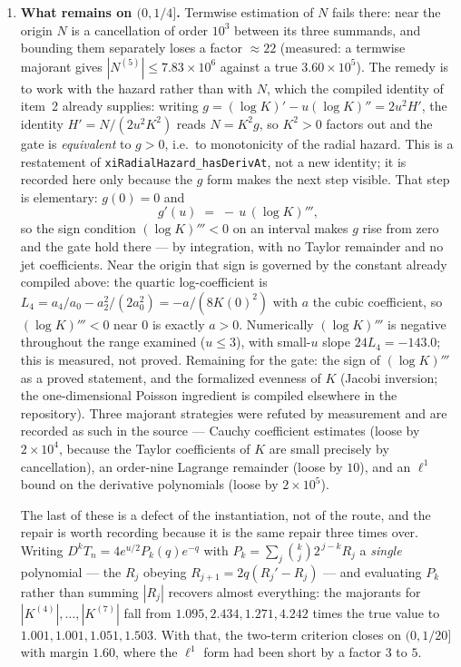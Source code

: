 \documentclass[11pt]{article}
\theoremstyle{plain}
\theoremstyle{definition}
\theoremstyle{remark}
\begin{document}
\begin{enumerate}
\item \textbf{What remains on $(0,1/4]$.}  Termwise estimation of $N$ fails
there: near the origin $N$ is a cancellation of order $10^{3}$ between its
three summands, and bounding them separately loses a factor $\approx22$
(measured: a termwise majorant gives $|N^{(5)}|\le7.83\times10^{6}$ against a
true $3.60\times10^{5}$).  The remedy is to work with the hazard rather than
with $N$, which the compiled identity of item~2 already supplies: writing
$g=(\log K)'-u(\log K)''=2u^{2}H'$, the identity
$H'=N/(2u^{2}K^{2})$ reads $N=K^{2}g$, so $K^{2}>0$ factors out and the gate
is \emph{equivalent} to $g>0$, i.e.\ to monotonicity of the radial hazard.
This is a restatement of \texttt{xiRadialHazard\_hasDerivAt}, not a new
identity; it is recorded here only because the $g$ form makes the next step
visible.  That step is elementary: $g(0)=0$ and
\[
  g'(u) \;=\; -\,u\,(\log K)''' ,
\]
so the sign condition $(\log K)'''<0$ on an interval makes $g$ rise from zero
and the gate hold there --- by integration, with no Taylor remainder and no
jet coefficients.  Near the origin that sign is governed by the constant
already compiled above: the quartic log-coefficient is
$L_4=a_4/a_0-a_2^{2}/(2a_0^{2})=-a/(8K(0)^{2})$ with $a$ the cubic
coefficient, so $(\log K)'''<0$ near $0$ is exactly $a>0$.  Numerically
$(\log K)'''$ is negative throughout the range examined ($u\le3$), with
small-$u$ slope $24L_4=-143.0$; this is measured, not proved.  Remaining for
the gate: the sign of $(\log K)'''$ as a proved statement, and the formalized
evenness of $K$ (Jacobi inversion; the one-dimensional Poisson ingredient is
compiled elsewhere in the repository).  Three majorant strategies were refuted
by measurement and are recorded as such in the source --- Cauchy coefficient
estimates (loose by $2\times10^{4}$, because the Taylor coefficients of $K$
are small precisely by cancellation), an order-nine Lagrange remainder (loose
by $10$), and an $\ell^{1}$ bound on the derivative polynomials (loose by
$2\times10^{5}$).

The last of these is a defect of the instantiation, not of the route, and the
repair is worth recording because it is the same repair three times over.
Writing $D^kT_n=4e^{u/2}P_k(q)e^{-q}$ with
$P_k=\sum_j\binom kj2^{\,j-k}R_j$ a \emph{single} polynomial --- the $R_j$
obeying $R_{j+1}=2q(R_j'-R_j)$ --- and evaluating $P_k$ rather than summing
$|R_j|$ recovers almost everything: the majorants for $|K^{(4)}|,\dots,
|K^{(7)}|$ fall from $1.095,2.434,1.271,4.242$ times the true value to
$1.001,1.001,1.051,1.503$. With that, the two-term criterion closes on
$(0,1/20]$ with margin $1.60$, where the $\ell^{1}$ form had been short by a
factor $3$ to $5$.


\end{enumerate}
\end{document}
